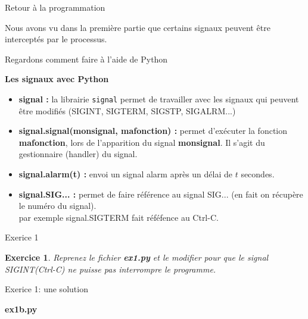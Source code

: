 \documentclass[9pt]{beamer}
\newenvironment{code}[1]{%
    \begin{bclogo}[couleur=backcolour, couleurTexte=black ,couleurBord=blue ,couleurBarre=black, ombre=false,epBord=0.9,logo=\#,arrondi=0.1]{{\bfseries #1}}%
    }%
    {%
    \end{bclogo}
}%
\newtheorem{exercise}{Exercice}
\begin{document}
\begin{frame}{Retour à la
    programmation}

Nous avons vu dans la première partie que certains signaux peuvent être interceptés par le processus. 

Regardons comment faire à l'aide de Python
\begin{bclogo}[couleur=couleurdef, couleurTexte=black ,couleurBord=black ,couleurBarre=blue, ombre=false,epBord=0.9,logo=\bcbook,arrondi=0.1]{{\bfseries Les signaux avec Python}}
\begin{itemize}
    \item[\textbullet] {\bfseries signal :} la librairie  \texttt{signal} permet de travailler avec les signaux qui peuvent être modifiés (SIGINT, SIGTERM, SIGSTP, SIGALRM...)
    \item[\textbullet] {\bfseries signal.signal(monsignal, mafonction) :} permet d'exécuter la fonction \textbf{mafonction}, lors de l'apparition du signal \textbf{monsignal}. Il s'agit du gestionnaire (handler) du signal.
    \item[\textbullet] {\bfseries signal.alarm(t) :} envoi un signal alarm après un délai de $t$ secondes.
    \item[\textbullet] {\bfseries signal.SIG... :} permet de faire référence au signal SIG...  (en fait on récupère le numéro du signal).\\
    par exemple signal.SIGTERM fait réféfence au Ctrl-C.
\end{itemize}
\end{bclogo}
\end{frame}

\begin{frame}{Exerice 1}
\begin{exercise}
Reprenez le fichier \textbf{ex1.py} et le modifier pour que le signal SIGINT(Ctrl-C) ne puisse pas interrompre le programme.
\end{exercise}
\end{frame}


 
\begin{frame}{Exerice 1: une solution}
\begin{code}{ex1b.py}
\solex
\end{code}
\end{frame}
\end{document}
